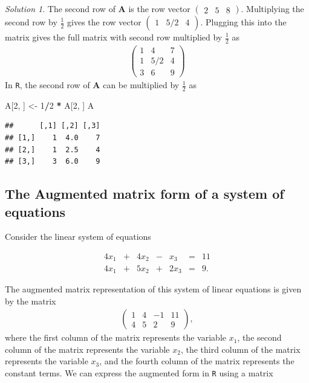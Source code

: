 \documentclass[
]{book}
\newenvironment{Shaded}{\begin{snugshade}}{\end{snugshade}}
\newcommand{\DecValTok}[1]{\textcolor[rgb]{0.00,0.00,0.81}{#1}}
\newcommand{\NormalTok}[1]{#1}
\newcommand{\OperatorTok}[1]{\textcolor[rgb]{0.81,0.36,0.00}{\textbf{#1}}}
\newcommand{\StringTok}[1]{\textcolor[rgb]{0.31,0.60,0.02}{#1}}
\theoremstyle{definition}
\theoremstyle{definition}
\theoremstyle{definition}
\theoremstyle{definition}
\theoremstyle{remark}
\newtheorem*{solution}{Solution}
\begin{document}
\begin{solution}
The second row of \(\mathbf{A}\) is the row vector \(\begin{pmatrix} 2 & 5 & 8 \end{pmatrix}\). Multiplying the second row by \(\frac{1}{2}\) gives the row vector \(\begin{pmatrix} 1 & 5/2 & 4 \end{pmatrix}\). Plugging this into the matrix gives the full matrix with second row multiplied by \(\frac{1}{2}\) as
\[
\begin{aligned}
\begin{pmatrix} 1 & 4 & 7 \\ 1 & 5/2 & 4 \\ 3 & 6 & 9 \end{pmatrix}
\end{aligned}
\]
In \texttt{R}, the second row of \(\mathbf{A}\) can be multiplied by \(\frac{1}{2}\) as

\begin{Shaded}
\begin{Highlighting}[]
\NormalTok{A[}\DecValTok{2}\NormalTok{, ] <-}\StringTok{ }\DecValTok{1}\OperatorTok{/}\DecValTok{2} \OperatorTok{*}\StringTok{ }\NormalTok{A[}\DecValTok{2}\NormalTok{, ]}
\NormalTok{A}
\end{Highlighting}
\end{Shaded}

\begin{verbatim}
##      [,1] [,2] [,3]
## [1,]    1  4.0    7
## [2,]    1  2.5    4
## [3,]    3  6.0    9
\end{verbatim}

\end{solution}

\hypertarget{the-augmented-matrix-form-of-a-system-of-equations}{%
\subsection{The Augmented matrix form of a system of equations}\label{the-augmented-matrix-form-of-a-system-of-equations}}

Consider the linear system of equations

\begin{alignat*}{4}
x_1   & {}+{} & 4 x_2 & {}-{} & x_3 & {}={} & 11 \\
4 x_1 & {}+{} & 5 x_2 & {}+{} & 2 x_3 & {}={} & 9.
\end{alignat*}

The augmented matrix representation of this system of linear equations is given by the matrix
\[
\begin{aligned}
\begin{pmatrix}
1 & 4 & - 1 & 11 \\
4 & 5 & 2   &  9
\end{pmatrix},
\end{aligned}
\]
where the first column of the matrix represents the variable \(x_1\), the second column of the matrix represents the variable \(x_2\), the third column of the matrix represents the variable \(x_3\), and the fourth column of the matrix represents the constant terms. We can express the augmented form in \texttt{R} using a matrix
\end{document}
